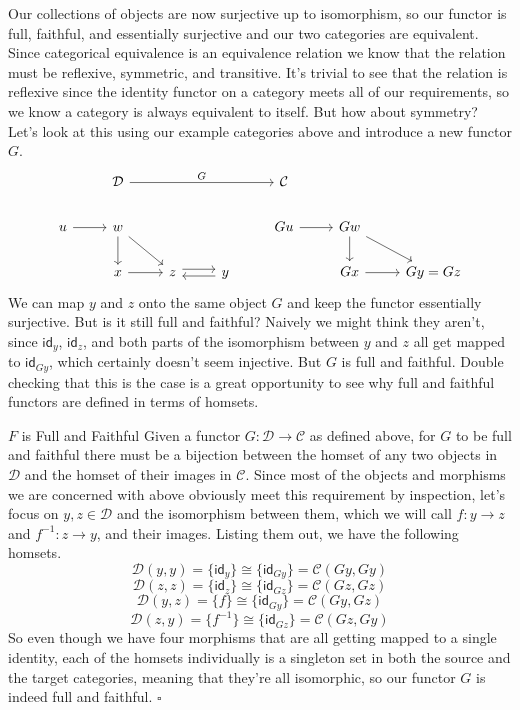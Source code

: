 \documentclass[12pt]{article}
\newcounter{examp}
\begin{document}
Our collections of objects are now surjective up to isomorphism, so our functor is full, faithful, and essentially surjective and our two categories are equivalent.
Since categorical equivalence is an equivalence relation we know that the relation must be reflexive, symmetric, and transitive.
It's trivial to see that the relation is reflexive since the identity functor on a category meets all of our requirements, so we know a category is always equivalent to itself.
But how about symmetry?
Let's look at this using our example categories above and introduce a new functor $G$.
\[\begin{tikzcd}
        & {\mathcal{D}} &&& {\mathcal{C}} \\
        u & w &&& Gu & Gw \\
        & x & z & y && Gx & {Gy=Gz}
        \arrow["G", from=1-2, to=1-5]
        \arrow[from=2-1, to=2-2]
        \arrow[from=2-2, to=3-2]
        \arrow[from=2-2, to=3-3]
        \arrow[from=2-5, to=2-6]
        \arrow[from=2-6, to=3-6]
        \arrow[from=2-6, to=3-7]
        \arrow[from=3-2, to=3-3]
        \arrow[shift left, from=3-3, to=3-4]
        \arrow[shift left, from=3-4, to=3-3]
        \arrow[from=3-6, to=3-7]
    \end{tikzcd}\]
We can map $y$ and $z$ onto the same object $G$ and keep the functor essentially surjective.
But is it still full and faithful?
Naively we might think they aren't, since $\mathsf{id}_y$, $\mathsf{id}_z$, and both parts of the isomorphism between $y$ and $z$ all get mapped to $\mathsf{id}_{Gy}$, which certainly doesn't seem injective.
But $G$ is full and faithful.
Double checking that this is the case is a great opportunity to see why full and faithful functors are defined in terms of homsets.
\begin{proofbox}{$F$ is Full and Faithful}{}
    Given a functor $G: \mathcal{D} \rightarrow \mathcal{C}$ as defined above, for $G$ to be full and faithful there must be a bijection between the homset of any two objects in $\mathcal{D}$ and the homset of their images in $\mathcal{C}$.
    Since most of the objects and morphisms we are concerned with above obviously meet this requirement by inspection, let's focus on $y,z \in \mathcal{D}$ and the isomorphism between them, which we will call $f:y\rightarrow z$ and $f^{-1}:z\rightarrow y$, and their images.
    Listing them out, we have the following homsets.
    $$\mathcal{D}(y, y) = \{\mathsf{id}_y\} \cong \{\mathsf{id}_{Gy}\} = \mathcal{C}(Gy, Gy)$$
    $$\mathcal{D}(z, z) = \{\mathsf{id}_z\} \cong \{\mathsf{id}_{Gz}\} = \mathcal{C}(Gz, Gz)$$
    $$\mathcal{D}(y, z) = \{f\} \cong \{\mathsf{id}_{Gy}\} = \mathcal{C}(Gy, Gz)$$
    $$\mathcal{D}(z, y) = \{f^{-1}\} \cong \{\mathsf{id}_{Gz}\} = \mathcal{C}(Gz, Gy)$$
    So even though we have four morphisms that are all getting mapped to a single identity, each of the homsets individually is a singleton set in both the source and the target categories, meaning that they're all isomorphic, so our functor $G$ is indeed full and faithful. $\square$
\end{proofbox}
\end{document}
